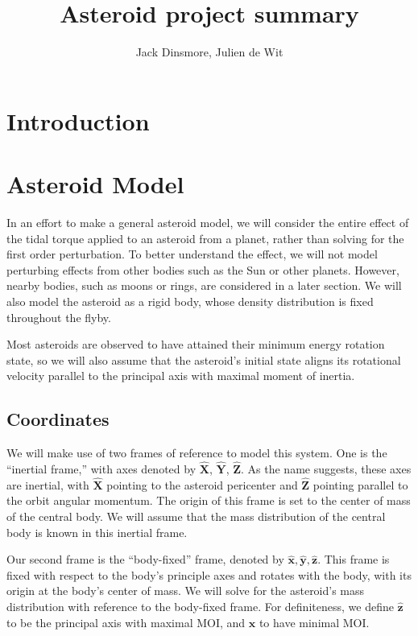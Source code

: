 \documentclass[11pt]{article}
\newcommand{\unit}[1]{\hat{\mathbf{#1}}}
\begin{document}
\title{Asteroid project summary}
\author{Jack Dinsmore, Julien de Wit}

\maketitle

\section{Introduction}


\section{Asteroid Model}
In an effort to make a general asteroid model, we will consider the entire effect of the tidal torque applied to an asteroid from a planet, rather than solving for the first order perturbation. To better understand the effect, we will not model perturbing effects from other bodies such as the Sun or other planets. However, nearby bodies, such as moons or rings, are considered in a later section. We will also model the asteroid as a rigid body, whose density distribution is fixed throughout the flyby.

Most asteroids are observed to have attained their minimum energy rotation state, so we will also assume that the asteroid's initial state aligns its rotational velocity parallel to the principal axis with maximal moment of inertia.

\subsection{Coordinates}
\label{sec:coordinates}
We will make use of two frames of reference to model this system. One is the ``inertial frame,'' with axes denoted by $\unit{X}$, $\unit{Y}$, $\unit{Z}$. As the name suggests, these axes are inertial, with $\unit{X}$ pointing to the asteroid pericenter and $\unit{Z}$ pointing parallel to the orbit angular momentum. The origin of this frame is set to the center of mass of the central body. We will assume that the mass distribution of the central body is known in this inertial frame.

Our second frame is the ``body-fixed'' frame, denoted by $\unit{x}, \unit{y}, \unit{z}$. This frame is fixed with respect to the body's principle axes and rotates with the body, with its origin at the body's center of mass. We will solve for the asteroid's mass distribution with reference to the body-fixed frame. For definiteness, we define $\unit{z}$ to be the principal axis with maximal MOI, and $\unit{x}$ to have minimal MOI.
\end{document}
